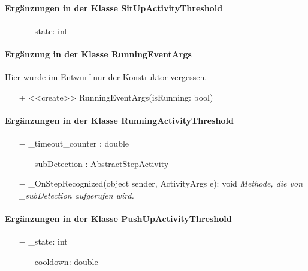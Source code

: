 \documentclass[a4paper,12pt]{article}
\begin{document}
\paragraph{Ergänzungen in der Klasse SitUpActivityThreshold}
\begin{itemize}
	\item [$-$] \_state: int
\end{itemize}
\paragraph{Ergänzung in der Klasse RunningEventArgs}
Hier wurde im Entwurf nur der Konstruktor vergessen.
\begin{itemize}
	\item [+] <<create>> RunningEventArgs(isRunning: bool)
\end{itemize}
\paragraph{Ergänzungen in der Klasse RunningActivityThreshold}
\begin{itemize}
	\item [$-$] \_timeout\_counter : double
	\item [$-$] \_subDetection : AbstractStepActivity
	\item [$-$] \_OnStepRecognized(object sender, ActivityArgs e): void \textit{Methode, die von \_subDetection aufgerufen wird.}
\end{itemize}
\paragraph{Ergänzungen in der Klasse PushUpActivityThreshold}
\begin{itemize}
	\item [$-$] \_state: int
	\item [$-$] \_cooldown: double
	
\end{itemize}
\end{document}
